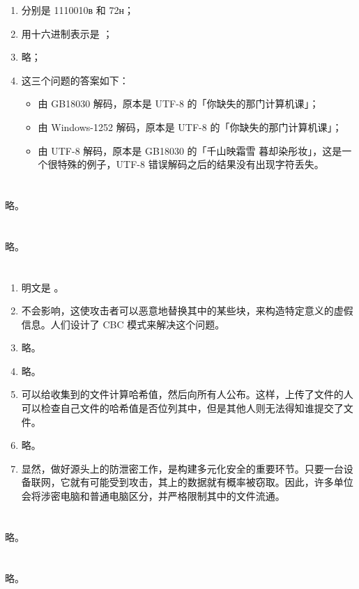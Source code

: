 \begin{enumerate}
  \item 分别是 1110010ʙ 和 72ʜ；
  \item 用十六进制表示是 ；
  \item 略；
  \item 这三个问题的答案如下：
    \begin{itemize}
      \item 由 GB18030 解码，原本是 UTF-8 的「你缺失的那门计算机课」；
      \item 由 Windows-1252 解码，原本是 UTF-8 的「你缺失的那门计算机课」；
      \item 由 UTF-8 解码，原本是 GB18030 的「千山映霜雪 暮却染彤妆」，这是一个很特殊的例子，UTF-8 错误解码之后的结果没有出现字符丢失。
    \end{itemize}
\end{enumerate}

\section{}

略。

\section{}

略。

\section{}

\begin{enumerate}
  \item 明文是 。
  \item 不会影响，这使攻击者可以恶意地替换其中的某些块，来构造特定意义的虚假信息。人们设计了 CBC 模式来解决这个问题。
  \item 略。
  \item 略。
  \item 可以给收集到的文件计算哈希值，然后向所有人公布。这样，上传了文件的人可以检查自己文件的哈希值是否位列其中，但是其他人则无法得知谁提交了文件。
  \item 略。
  \item 显然，做好源头上的防泄密工作，是构建多元化安全的重要环节。只要一台设备联网，它就有可能受到攻击，其上的数据就有概率被窃取。因此，许多单位会将涉密电脑和普通电脑区分，并严格限制其中的文件流通。
\end{enumerate}

\section{}

略。

\section{}

略。